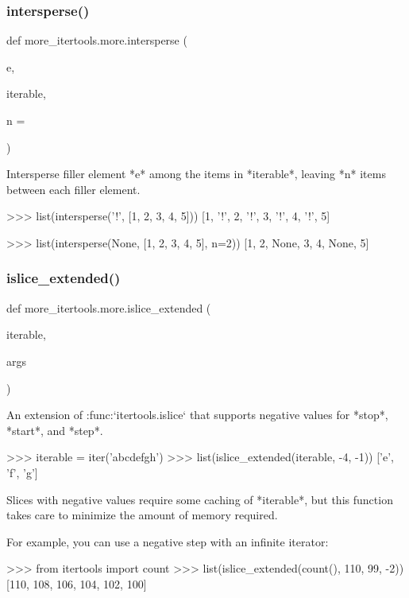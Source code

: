 \subsubsection{\texorpdfstring{intersperse()}{intersperse()}}
{\footnotesize\ttfamily def more\+\_\+itertools.\+more.\+intersperse (\begin{DoxyParamCaption}\item[{}]{e,  }\item[{}]{iterable,  }\item[{}]{n = {} }\end{DoxyParamCaption})}

\begin{DoxyVerb}Intersperse filler element *e* among the items in *iterable*, leaving
*n* items between each filler element.

    >>> list(intersperse('!', [1, 2, 3, 4, 5]))
    [1, '!', 2, '!', 3, '!', 4, '!', 5]

    >>> list(intersperse(None, [1, 2, 3, 4, 5], n=2))
    [1, 2, None, 3, 4, None, 5]\end{DoxyVerb}
 \mbox{\label{namespacemore__itertools_1_1more_ab68caf22251b072e1ddd4db4b183d340}} 
\subsubsection{\texorpdfstring{islice\+\_\+extended()}{islice\_extended()}}
{\footnotesize\ttfamily def more\+\_\+itertools.\+more.\+islice\+\_\+extended (\begin{DoxyParamCaption}\item[{}]{iterable,  }\item[{}]{args }\end{DoxyParamCaption})}

\begin{DoxyVerb}An extension of :func:`itertools.islice` that supports negative values
for *stop*, *start*, and *step*.

    >>> iterable = iter('abcdefgh')
    >>> list(islice_extended(iterable, -4, -1))
    ['e', 'f', 'g']

Slices with negative values require some caching of *iterable*, but this
function takes care to minimize the amount of memory required.

For example, you can use a negative step with an infinite iterator:

    >>> from itertools import count
    >>> list(islice_extended(count(), 110, 99, -2))
    [110, 108, 106, 104, 102, 100]\end{DoxyVerb}
 \mbox{\label{namespacemore__itertools_1_1more_a071f4513345c1187be5fc1cb8ea729f4}} 
